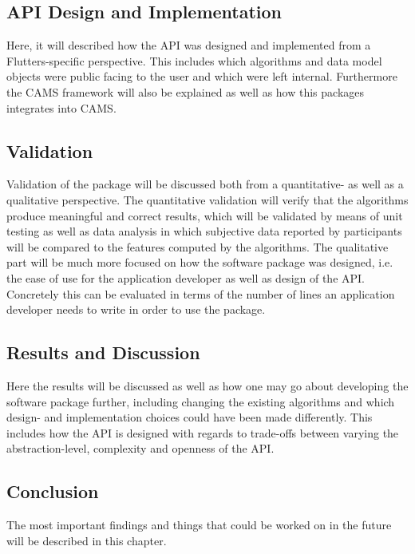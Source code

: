 \subsection{API Design and Implementation}
Here, it will described how the API was designed and implemented from a Flutters-specific perspective. This includes which algorithms and data model objects were public facing to the user and which were left internal. Furthermore the CAMS framework will also be explained as well as how this packages integrates into CAMS.

\subsection{Validation}
Validation of the package will be discussed both from a quantitative- as well as a qualitative perspective. The quantitative validation will verify that the algorithms produce meaningful and correct results, which will be validated by means of unit testing as well as data analysis in which subjective data reported by participants will be compared to the features computed by the algorithms. The qualitative part will be much more focused on how the software package was designed, i.e. the ease of use for the application developer as well as design of the API. Concretely this can be evaluated in terms of the number of lines an application developer needs to write in order to use the package.

\subsection{Results and Discussion}
Here the results will be discussed as well as how one may go about developing the software package further, including changing the existing algorithms and which design- and implementation choices could have been made differently. This includes how the API is designed with regards to trade-offs between varying the abstraction-level, complexity and openness of the API.

\subsection{Conclusion}
The most important findings and things that could be worked on in the future will be described in this chapter.

